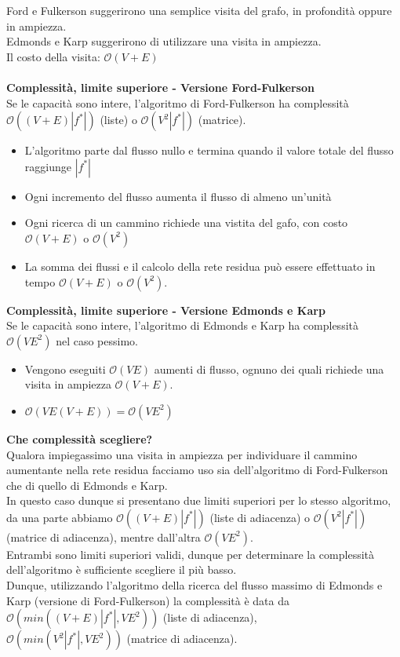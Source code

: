 \documentclass[../cheatSheetAlgoritmi.tex]{subfiles}
\begin{document}
Ford e Fulkerson suggerirono una semplice visita del grafo, in profondità oppure in ampiezza. \\Edmonds e Karp suggerirono di utilizzare una visita in ampiezza. \\
Il costo della visita: $\mathcal{O}(V + E)$ \\\\
\textbf{Complessità, limite superiore - Versione Ford-Fulkerson} \\
Se le capacità sono intere, l'algoritmo di Ford-Fulkerson ha complessità $\mathcal{O}((V + E)|f^{*}|)$ (liste) o $\mathcal{O}(V^2 |f^*|)$ (matrice).
\begin{itemize}
	\item L'algoritmo parte dal flusso nullo e termina quando il valore totale del flusso raggiunge $|f^*|$
	\item Ogni incremento del flusso aumenta il flusso di almeno un'unità
	\item Ogni ricerca di un cammino richiede una vistita del gafo, con costo $\mathcal{O}(V + E)$ o $\mathcal{O}(V^2)$
	\item La somma dei flussi e il calcolo della rete residua può essere effettuato in tempo $\mathcal{O}(V + E) $ o $\mathcal{O}(V^2)$.
\end{itemize}
\textbf{Complessità, limite superiore - Versione Edmonds e Karp} \\
Se le capacità sono intere, l'algoritmo di Edmonds e Karp ha complessità $\mathcal{O}(VE^2)$ nel caso pessimo. 
\begin{itemize}
	\item Vengono eseguiti $\mathcal{O}(VE)$ aumenti di flusso, ognuno dei quali richiede una visita in ampiezza $\mathcal{O}(V + E)$.
	\item $\mathcal{O}(VE(V + E)) = \mathcal{O}(VE^2)$
\end{itemize}
\textbf{Che complessità scegliere?}\\
Qualora impiegassimo una visita in ampiezza per individuare il cammino aumentante nella rete residua facciamo uso sia dell'algoritmo di Ford-Fulkerson che di quello di Edmonds e Karp. \\
In questo caso dunque si presentano due limiti superiori per lo stesso algoritmo, da una parte abbiamo $\mathcal{O}((V + E)|f^{*}|)$ (liste di adiacenza) o $\mathcal{O}(V^2 |f^*|)$ (matrice di adiacenza), mentre dall'altra  $\mathcal{O}(VE^2)$.\\
Entrambi sono limiti superiori validi, dunque per determinare la complessità dell'algoritmo è sufficiente scegliere il più basso. \\
Dunque, utilizzando l'algoritmo della ricerca del flusso massimo di Edmonds e Karp (versione di Ford-Fulkerson) la complessità è data da $\mathcal{O}(min((V + E)|f^{*}|, VE^2))$ (liste di adiacenza),\\ $\mathcal{O}(min(V^2|f^{*}|, VE^2))$ (matrice di adiacenza).
\end{document}
